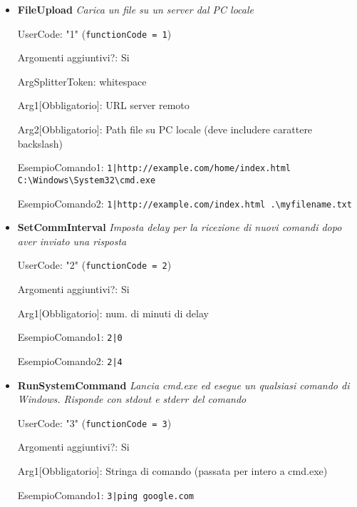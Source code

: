 \documentclass[
    a4paper, %
    11pt %
]{article}
\begin{document}
        \begin{itemize}
            \item \textbf{FileUpload} \textit{Carica un file su un server dal PC locale}
            
                UserCode: "1" (\texttt{functionCode = 1}) 
                
                Argomenti aggiuntivi?: Si
                
                ArgSplitterToken: whitespace 
                
                Arg1[Obbligatorio]: URL server remoto
                
                Arg2[Obbligatorio]: Path file su PC locale (deve includere carattere backslash)
                
                EsempioComando1: \texttt{1|http://example.com/home/index.html C:\textbackslash Windows\textbackslash System32\textbackslash cmd.exe}
                
                EsempioComando2: \texttt{1|http://example.com/index.html .\textbackslash myfilename.txt}
                
            \item \textbf{SetCommInterval} \textit{Imposta delay per la ricezione di nuovi comandi dopo aver
            inviato una risposta}
            
                UserCode: "2" (\texttt{functionCode = 2}) 
                
                Argomenti aggiuntivi?: Si
                
                Arg1[Obbligatorio]: num. di minuti di delay
                
                EsempioComando1: \texttt{2|0}
                
                EsempioComando2: \texttt{2|4}

            \item \textbf{RunSystemCommand} \textit{Lancia cmd.exe ed esegue un qualsiasi comando di Windows.
            Risponde con stdout e stderr del comando}

                UserCode: "3" (\texttt{functionCode = 3}) 
                
                Argomenti aggiuntivi?: Si
                
                Arg1[Obbligatorio]: Stringa di comando (passata per intero a cmd.exe)

                EsempioComando1: \texttt{3|ping google.com}
                

\end{itemize}
\end{document}
